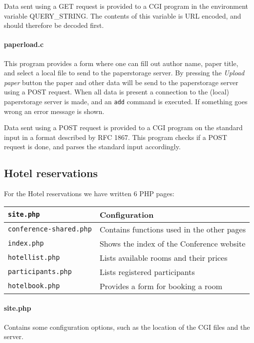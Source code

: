 \documentclass[a4paper,10pt]{article}
\begin{document}
Data sent using a \textsc{GET} request is provided to a CGI program in the environment
variable \textsc{QUERY\_STRING}. The contents of this variable is URL encoded, and should
therefore be decoded first.

\paragraph{paperload.c}
This program provides a form where one can fill out author name, paper title, and
select a local file to send to the paperstorage server. By pressing the
\textit{Upload paper} button the paper and other data will be send to the paperstorage
server using a \textsc{POST} request. When all data is present a connection to the
(local) paperstorage server is made, and an \texttt{add} command is executed. If
something goes wrong an error message is shown.

Data sent using a \textsc{POST} request is provided to a CGI program on the standard
input in a format described by RFC 1867. This program checks if a \textsc{POST} request
is done, and parses the standard input accordingly.

\subsection{Hotel reservations}

For the Hotel reservations we have written 6 PHP pages:
\begin{center}
\begin{tabular}{ l | p{9cm} }
\texttt{site.php} & Configuration\\ \hline
\texttt{conference-shared.php} & Contains functions used in the other pages\\ \hline
\texttt{index.php} & Shows the index of the Conference website\\ \hline
\texttt{hotellist.php} & Lists available rooms and their prices\\ \hline
\texttt{participants.php} & Lists registered participants\\ \hline
\texttt{hotelbook.php} & Provides a form for booking a room\\
\end{tabular}
\end{center}

\paragraph{site.php}
Contains some configuration options, such as the location of the CGI files
and the  server.
\end{document}

